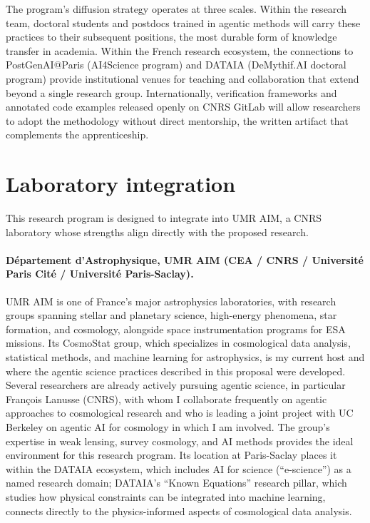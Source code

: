 \documentclass[11pt, a4paper]{article}
\begin{document}
The program's diffusion strategy operates at three scales.
Within the research team, doctoral students and postdocs trained in agentic methods will carry these practices to their subsequent positions, the most durable form of knowledge transfer in academia.
Within the French research ecosystem, the connections to PostGenAI@Paris (AI4Science program) and DATAIA (DeMythif.AI doctoral program) provide institutional venues for teaching and collaboration that extend beyond a single research group.
Internationally, verification frameworks and annotated code examples released openly on CNRS GitLab will allow researchers to adopt the methodology without direct mentorship, the written artifact that complements the apprenticeship.

\section{Laboratory integration}

This research program is designed to integrate into UMR AIM, a CNRS laboratory whose strengths align directly with the proposed research.

\paragraph{D\'epartement d'Astrophysique, UMR AIM (CEA / CNRS / Universit\'e Paris Cit\'e / Universit\'e Paris-Saclay).}
UMR AIM is one of France's major astrophysics laboratories, with research groups spanning stellar and planetary science, high-energy phenomena, star formation, and cosmology, alongside space instrumentation programs for ESA missions.
Its CosmoStat group, which specializes in cosmological data analysis, statistical methods, and machine learning for astrophysics, is my current host and where the agentic science practices described in this proposal were developed.
Several researchers are already actively pursuing agentic science, in particular Fran\c{c}ois Lanusse (CNRS), with whom I collaborate frequently on agentic approaches to cosmological research and who is leading a joint project with UC Berkeley on agentic AI for cosmology in which I am involved.
The group's expertise in weak lensing, survey cosmology, and AI methods provides the ideal environment for this research program.
Its location at Paris-Saclay places it within the DATAIA ecosystem, which includes AI for science (``e-science'') as a named research domain; DATAIA's ``Known Equations'' research pillar, which studies how physical constraints can be integrated into machine learning, connects directly to the physics-informed aspects of cosmological data analysis.
\end{document}
